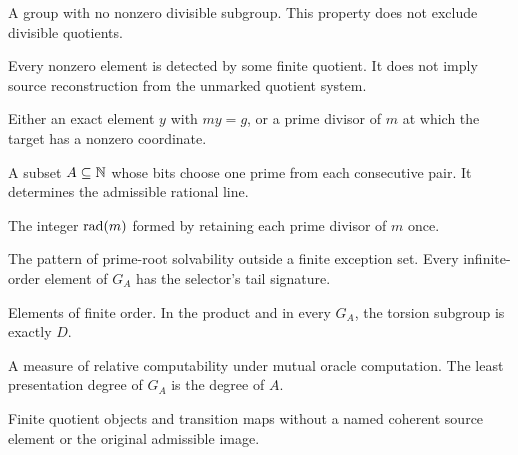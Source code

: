 \begin{description}[style=nextline,leftmargin=0pt,labelindent=0pt,labelwidth=0pt,labelsep=0pt,itemindent=0pt,font=\bfseries\color{Ink},itemsep=9pt]
\item[Reduced group] A group with no nonzero divisible subgroup. This property does not exclude divisible quotients.
\item[Residual finiteness] Every nonzero element is detected by some finite quotient. It does not imply source reconstruction from the unmarked quotient system.
\item[Root certificate] Either an exact element $y$ with $my=g$, or a prime divisor of $m$ at which the target has a nonzero coordinate.
\item[Selector] A subset $A\subseteq\mathbb N$ whose bits choose one prime from each consecutive pair. It determines the admissible rational line.
\item[Squarefree radical] The integer $\operatorname{rad}(m)$ formed by retaining each prime divisor of $m$ once.
\item[Tail signature] The pattern of prime-root solvability outside a finite exception set. Every infinite-order element of $G_A$ has the selector's tail signature.
\item[Torsion] Elements of finite order. In the product and in every $G_A$, the torsion subgroup is exactly $D$.
\item[Turing degree] A measure of relative computability under mutual oracle computation. The least presentation degree of $G_A$ is the degree of $A$.
\item[Unmarked observations] Finite quotient objects and transition maps without a named coherent source element or the original admissible image.
\end{description}
